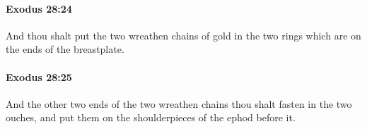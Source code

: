 		\paragraph{Exodus 28:24} %
			\label{EXODUS-28-24}

			And thou shalt put the two wreathen chains of gold in the two rings which are on the ends of the breastplate.


		\paragraph{Exodus 28:25} %
			\label{EXODUS-28-25}

			And the other two ends of the two wreathen chains thou shalt fasten in the two ouches, and put them on the shoulderpieces of the ephod before it.


